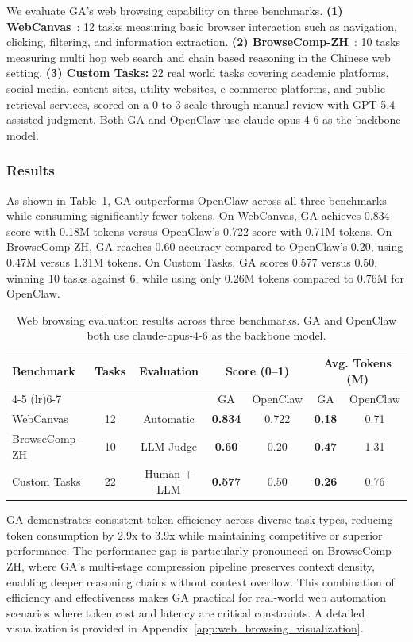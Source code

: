 We evaluate GA's web browsing capability on three benchmarks.
\textbf{(1) WebCanvas}~\citep{webcanvas}: 12 tasks measuring basic browser interaction such as navigation, clicking, filtering, and information extraction.
\textbf{(2) BrowseComp-ZH}~\citep{browsecomp_zh}: 10 tasks measuring multi hop web search and chain based reasoning in the Chinese web setting.
\textbf{(3) Custom Tasks:} 22 real world tasks covering academic platforms, social media, content sites, utility websites, e commerce platforms, and public retrieval services, scored on a 0 to 3 scale through manual review with GPT-5.4 assisted judgment.
Both GA and OpenClaw use claude-opus-4-6 as the backbone model.

\subsubsection{Results}
\label{sec:exp_browsing_results}

As shown in Table~\ref{tab:web_browsing_results}, GA outperforms OpenClaw across all three benchmarks while consuming significantly fewer tokens. On WebCanvas, GA achieves 0.834 score with 0.18M tokens versus OpenClaw's 0.722 score with 0.71M tokens. On BrowseComp-ZH, GA reaches 0.60 accuracy compared to OpenClaw's 0.20, using 0.47M versus 1.31M tokens. On Custom Tasks, GA scores 0.577 versus 0.50, winning 10 tasks against 6, while using only 0.26M tokens compared to 0.76M for OpenClaw.

\begin{table}[t]
\centering
\small
\caption{Web browsing evaluation results across three benchmarks. GA and OpenClaw both use claude-opus-4-6 as the backbone model.}
\begin{tabular}{lcccccc}
\toprule
\multirow{2}{*}{Benchmark} & \multirow{2}{*}{Tasks} & \multirow{2}{*}{Evaluation} & \multicolumn{2}{c}{Score (0--1)} & \multicolumn{2}{c}{Avg. Tokens (M)} \\
\cmidrule(lr){4-5} \cmidrule(lr){6-7}
 &  &  & GA & OpenClaw & GA & OpenClaw \\
\midrule
WebCanvas & 12 & Automatic & \textbf{0.834} & 0.722 & \textbf{0.18} & 0.71 \\
BrowseComp-ZH & 10 & LLM Judge & \textbf{0.60} & 0.20 & \textbf{0.47} & 1.31 \\
Custom Tasks & 22 & Human + LLM & \textbf{0.577} & 0.50 & \textbf{0.26} & 0.76 \\
\bottomrule
\end{tabular}
\label{tab:web_browsing_results}
\end{table}

GA demonstrates consistent token efficiency across diverse task types, reducing token consumption by 2.9x to 3.9x while maintaining competitive or superior performance. The performance gap is particularly pronounced on BrowseComp-ZH, where GA's multi-stage compression pipeline preserves context density, enabling deeper reasoning chains without context overflow. This combination of efficiency and effectiveness makes GA practical for real-world web automation scenarios where token cost and latency are critical constraints. A detailed visualization is provided in Appendix~\ref{app:web_browsing_visualization}.
